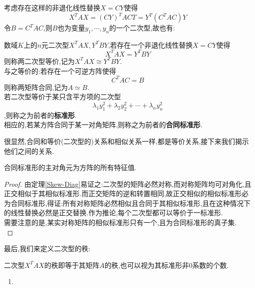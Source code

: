 \documentclass[UTF8,a4paper,notitlepage]{book}
\begin{document}
        考虑存在这样的非退化线性替换$X=CY$使得$$X^TAX=(CY)^TACT=Y^T(C^TAC)Y$$令$B=C^TAC$,则$B$也为变量$y_1,\cdots,y_n$的一个二次型,故也有:
        \begin{definition}[Congruence(合同)]
            数域$K$上的$n$元二次型$X^TAX,Y^TBY$,若存在一个非退化线性替换$X=CY$使得$$X^TAX=Y^TBY$$则称两二次型等价,记为$X^TAX\cong Y^TBY$.\\ 
            与之等价的:若存在一个可逆方阵使得$$C^TAC=B$$则称两矩阵合同,记为$A\simeq B$.\\ 
            若二次型等价于某只含平方项的二次型$$\lambda_1y^2_1+\lambda_2y_2^2+\cdots+\lambda_ny^2_n$$,则称之为前者的\textbf{标准形}.\\ 
            相应的,若某方阵合同于某一对角矩阵,则称之为前者的\textbf{合同标准形}.
        \end{definition}
        很显然,合同和等价(二次型的)关系和相似关系一样,都是等价关系,接下来我们揭示他们之间的关系.
        \begin{theorem}
            合同标准形的主对角元为方阵的所有特征值.
        \end{theorem}
        \begin{proof}
            由定理\ref{Skew-Diag}易证之:二次型的矩阵必然对称,而对称矩阵均可对角化,且正交相似于其相似标准形.而正交矩阵的逆和转置相同,故正交相似的相似标准形必为合同标准形,得证:所有对称矩阵必然相似且合同于其相似标准形,且在这种情况下的线性替换必然是正交替换.作为推论,每个二次型都可以等价于一标准形.\\ 
            需要注意的是,某实对称矩阵的相似标准形只有一个,且为合同标准形的真子集.\\ 
        \end{proof}
        最后,我们来定义二次型的秩:
        \begin{definition}[二次型的秩]
            二次型$X^TAX$的秩即等于其矩阵$A$的秩,也可以视为其标准形非0系数的个数.
        \end{definition}
        \begin{corollary}[]\begin{enumerate}\mbox{}
            \item %
        \end{enumerate}\end{corollary}
\end{document}
